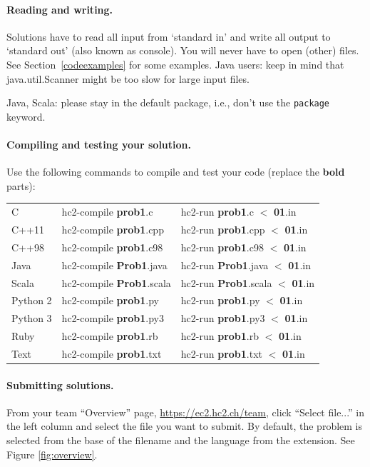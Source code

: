 \paragraph{Reading and writing.}
Solutions have to read all input from `standard in' and write all
output to `standard out' (also known as console). You will never have
to open (other) files. See Section~\ref{codeexamples} for some
examples. Java users: keep in mind that java.util.Scanner might
be too slow for large input files.

Java, Scala: please stay in the default package, i.e., don't use the \texttt{package} keyword.


\paragraph{Compiling and testing your solution.}
Use the following commands to compile and test your code (replace the \textbf{bold} parts):
\begin{center}
\begin{tabular}{l|p{5cm}|p{7cm}}
C&hc2-compile \textbf{prob1}.c &hc2-run \textbf{prob1}.c $<$ \textbf{01}.in\\
C++11&hc2-compile \textbf{prob1}.cpp &hc2-run \textbf{prob1}.cpp $<$ \textbf{01}.in\\
C++98&hc2-compile \textbf{prob1}.c98 &hc2-run \textbf{prob1}.c98 $<$ \textbf{01}.in\\
Java&hc2-compile \textbf{Prob1}.java &hc2-run \textbf{Prob1}.java $<$ \textbf{01}.in\\
Scala&hc2-compile \textbf{Prob1}.scala &hc2-run \textbf{Prob1}.scala $<$ \textbf{01}.in\\
Python 2&hc2-compile \textbf{prob1}.py &hc2-run \textbf{prob1}.py $<$ \textbf{01}.in\\
Python 3&hc2-compile \textbf{prob1}.py3 &hc2-run \textbf{prob1}.py3 $<$ \textbf{01}.in\\
Ruby&hc2-compile \textbf{prob1}.rb &hc2-run \textbf{prob1}.rb $<$ \textbf{01}.in\\
Text&hc2-compile \textbf{prob1}.txt &hc2-run \textbf{prob1}.txt $<$ \textbf{01}.in\\
\end{tabular}
\end{center}

\paragraph{Submitting solutions.}
From your team ``Overview'' page,
\url{https://ec2.hc2.ch/team},
click ``Select file...'' in the left column and select the file
you want to submit. By default, the problem is selected from the
base of the filename and the language from the extension.
See Figure \ref{fig:overview}.

